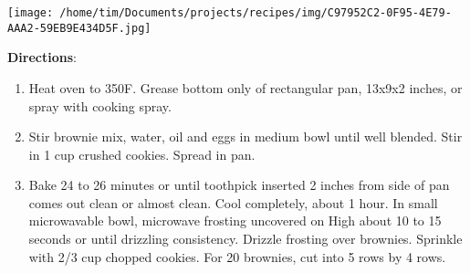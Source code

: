 \documentclass[11pt, twoside, openany]{book}
\begin{document}
\begin{minipage}[t]{0.2\linewidth}
\centering \strut\vspace*{-\baselineskip}\newline
\texttt{[image: /home/tim/Documents/projects/recipes/img/C97952C2-0F95-4E79-AAA2-59EB9E434D5F.jpg]}\\
\end{minipage}\vspace{3mm}
\textbf{Directions}:
\vspace{-3mm}\begin{enumerate}\setlength\itemsep{-1mm}
\item Heat oven to 350F. Grease bottom only of rectangular pan, 13x9x2 inches, or spray with cooking spray.
\item Stir brownie mix, water, oil and eggs in medium bowl until well blended. Stir in 1 cup crushed cookies. Spread in pan.
\item Bake 24 to 26 minutes or until toothpick inserted 2 inches from side of pan comes out clean or almost clean. Cool completely, about 1 hour. In small microwavable bowl, microwave frosting uncovered on High about 10 to 15 seconds or until drizzling consistency. Drizzle frosting over brownies. Sprinkle with 2/3 cup chopped cookies. For 20 brownies, cut into 5 rows by 4 rows.
\end{enumerate}
 \label{slow-cooker-meaty-italian-spaghetti-sauce}\hfill\textit{}\\
\end{document}
